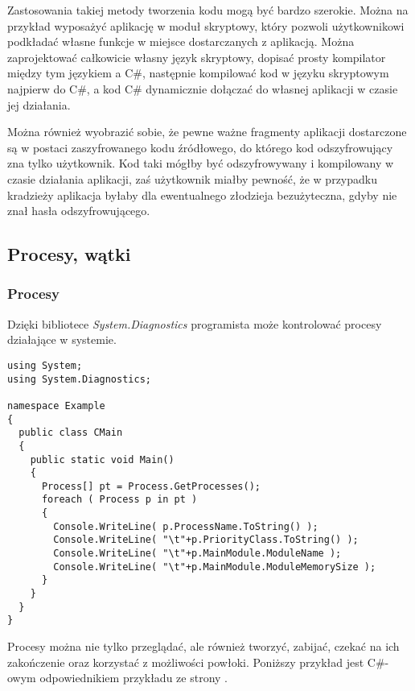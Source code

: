 Zastosowania takiej metody tworzenia kodu mogą być bardzo szerokie. Można na przykład wyposażyć aplikację
w moduł skryptowy, który pozwoli użytkownikowi podkładać własne funkcje w miejsce dostarczanych z aplikacją.
Można zaprojektować całkowicie własny język skryptowy, dopisać prosty kompilator między
tym językiem a C\#, następnie kompilować kod w języku skryptowym najpierw do C\#, a
kod C\# dynamicznie dołączać do własnej aplikacji w czasie jej działania.

Można również wyobrazić sobie, że pewne ważne fragmenty aplikacji dostarczone są w postaci zaszyfrowanego kodu
źródłowego, do którego kod odszyfrowujący zna tylko użytkownik. Kod taki mógłby być odszyfrowywany i kompilowany
w czasie działania aplikacji, zaś użytkownik miałby pewność, że w przypadku kradzieży aplikacja byłaby
dla ewentualnego złodzieja bezużyteczna, gdyby nie znał hasła odszyfrowującego.

\subsection{Procesy, wątki}

\subsubsection{Procesy}

Dzięki bibliotece {\em System.Diagnostics} programista może kontrolować procesy działające w systemie.

\begin{scriptsize}
\begin{verbatim}
using System;
using System.Diagnostics;

namespace Example
{
  public class CMain
  {
    public static void Main()
    {
      Process[] pt = Process.GetProcesses();
      foreach ( Process p in pt )
      {
        Console.WriteLine( p.ProcessName.ToString() ); 
        Console.WriteLine( "\t"+p.PriorityClass.ToString() );
        Console.WriteLine( "\t"+p.MainModule.ModuleName );
        Console.WriteLine( "\t"+p.MainModule.ModuleMemorySize );
      }
    }
  }
}
\end{verbatim}
\end{scriptsize}

Procesy można nie tylko przeglądać, ale również tworzyć, zabijać, czekać na ich zakończenie oraz
korzystać z możliwości powłoki. Poniższy przykład jest C\#-owym odpowiednikiem przykładu ze strony 
\pageref{powlokaSystemu}.

